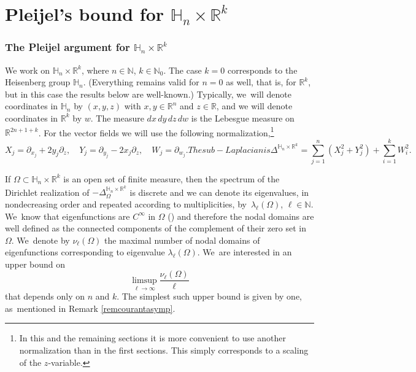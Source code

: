 \documentclass[JEP,XML,SOM,Unicode,published]{cedram}
\theoremstyle{definition}
\newcommand{\1}{\mathbbm{1}}
\newcommand{\N}{\mathbb{N}}
\newcommand{\R}{\mathbb{R}}
\begin{document}
\part{Pleijel's bound for \texorpdfstring{$\mathbb H_n\times\R^k$}{HnRk}}\label{part2}

\section{The Pleijel argument for \texorpdfstring{$\mathbb H_n\times\R^k$}{HnRk} }\label{sec:mainhnrk}

We work on $\mathbb H_n\times\R^k$, where $n\in\N$, $k\in\N_0$. The case $k=0$ corresponds to the Heisenberg group $\mathbb H_n$. (Everything remains valid for $n=0$ as well, that is, for $\R^k$, but in this case the results below are well-known.) Typically, we~will denote coordinates in $\mathbb H_n$ by $(x,y,z)$ with $x,y\in\R^n$ and $z\in\R$, and we will denote coordinates in $\R^k$ by $w$. The measure $dx\,dy\,dz\,dw$ is the Lebesgue measure on $\R^{2n+1+k}$. For the vector fields we will use the following normalization,\footnote{In this and the remaining sections it is more convenient to use another normalization than in the first sections. This simply corresponds to a scaling of the $z$-variable.}
\begin{subequations}\label{Otherformulation}
\begin{equation}
X_j = \partial_{x_j} + 2y_j \partial_z,\quad
Y_j = \partial_{y_j} - 2x_j \partial_z,\quad
W_j = \partial_{w_j}.
\end{equation}
The sub-Laplacian is
\begin{equation}
\Delta^{\mathbb H_n\times\R^k} = \sum_{j=1}^n (X_j^2 + Y_j^2) + \sum_{i=1}^k W_i^2.
\end{equation}
\end{subequations}

If $\Omega\subset\mathbb H_n\times\R^k$ is an open set of finite measure, then the spectrum of the Dirichlet realization of $ -\Delta^{\mathbb H_n\times\R^k}_\Omega $ is discrete and we can denote its eigenvalues, in nondecreasing order and repeated according to multiplicities, by~$\lambda_\ell(\Omega)$, $\ell\in\N$. We~know that eigenfunctions are $C^\infty$ in $\Omega$ (\cite{Ho}) and therefore the nodal domains are well defined as the connected components of the complement of their zero set in $\Omega$. We~denote by $\nu_\ell(\Omega)$ the maximal number of nodal domains of eigenfunctions corresponding to eigenvalue $\lambda_\ell(\Omega)$. We~are interested in an upper bound on
\[
\limsup_{\ell\to\infty} \frac{\nu_\ell(\Omega)}{\ell}
\]
that depends only on $n$ and $k$. The simplest such upper bound is given by one, as~mentioned in Remark \ref{remcourantasymp}.
\end{document}
